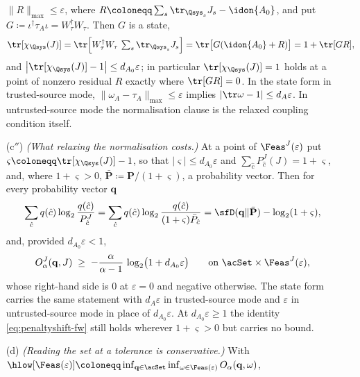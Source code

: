\begin{proposition}
\begin{enumerate}[label=(\alph*),leftmargin=2.4em]
  $\|R\|_{\max}\le\varepsilon$, where
  $R\coloneqq\sum_s\tr_{\Qsys_s}J_s-\idon{A_0}$, and put
  $G\coloneqq\iota^{\dagger}\tau_A\iota=W_{\tau}^{\dagger}W_{\tau}$. Then
  $G$ is a state,
  \begin{equation}\label{eq:choi-trace-residual}
    \tr[\chi_{\Qsys}(J)]
    =\tr\Big[W_{\tau}^{\dagger}W_{\tau}\,
      \textstyle\sum_s\tr_{\Qsys_s}J_s\Big]
    =\tr\big[G(\idon{A_0}+R)\big]
    =1+\tr[GR],
  \end{equation}
  and $\big|\tr[\chi_{\Qsys}(J)]-1\big|\le d_{A_0}\varepsilon$; in
  particular $\tr[\chi_{\Qsys}(J)]=1$ holds at a point of nonzero residual
  $R$ exactly where $\tr[GR]=0$. In the state form in trusted-source mode,
  $\|\omega_A-\tau_A\|_{\max}\le\varepsilon$ implies
  $|\tr\omega-1|\le d_A\varepsilon$. In untrusted-source mode the
  normalisation clause is the relaxed coupling condition itself.
\item[(c$''$)] \emph{(What relaxing the normalisation costs.)} At a point
  of $\Feas^{J}(\varepsilon)$ put
  $\varsigma\coloneqq\tr[\chi_{\Qsys}(J)]-1$, so that
  $|\varsigma|\le d_{A_0}\varepsilon$ and
  $\sum_{\hat c}P^{J}_{\hat c}(J)=1+\varsigma$, and, where $1+\varsigma>0$,
  $\bar{\mathbf P}\coloneqq\mathbf P/(1+\varsigma)$, a probability vector.
  Then for every probability vector $\mathbf q$
  \begin{equation}\label{eq:penaltyshift-fw}
    \sum_{\hat c}q(\hat c)\log_2\frac{q(\hat c)}{P^{J}_{\hat c}}
    =\sum_{\hat c}q(\hat c)\log_2\frac{q(\hat c)}{(1+\varsigma)\bar P_{\hat c}}
    =\sfD(\mathbf q\|\bar{\mathbf P})-\log_2(1+\varsigma),
  \end{equation}
  and, provided $d_{A_0}\varepsilon<1$,
  \begin{equation}\label{eq:relaxed-objective-floor}
    O^{J}_{\alpha}(\mathbf q,J)\;\ge\;
    -\frac{\alpha}{\alpha-1}\,\log_2\!\big(1+d_{A_0}\varepsilon\big)
    \qquad\text{on }\acSet\times\Feas^{J}(\varepsilon),
  \end{equation}
  whose right-hand side is $0$ at $\varepsilon=0$ and negative otherwise.
  The state form carries the same statement with $d_A\varepsilon$ in
  trusted-source mode and $\varepsilon$ in untrusted-source mode in place of
  $d_{A_0}\varepsilon$. At $d_{A_0}\varepsilon\ge1$ the identity
  \eqref{eq:penaltyshift-fw} still holds wherever $1+\varsigma>0$ but
  carries no bound.
\item[(d)] \emph{(Reading the set at a tolerance is conservative.)} With
  $\hlow[\Feas(\varepsilon)]\coloneqq\inf_{\mathbf q\in\acSet}
  \inf_{\omega\in\Feas(\varepsilon)}O_{\alpha}(\mathbf q,\omega)$,

\end{enumerate}
\end{proposition}
